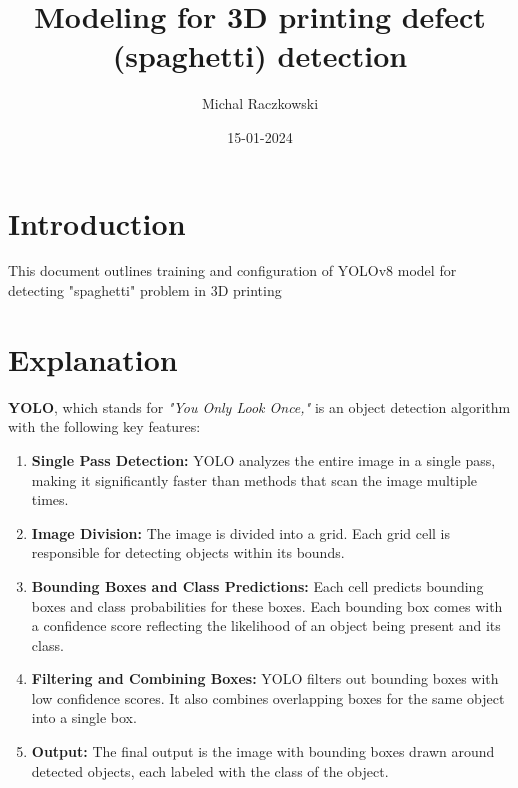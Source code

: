 \documentclass[12pt,a4paper]{article}
\title{\textbf{Modeling for 3D printing defect (spaghetti) detection }}
\author{Michal Raczkowski}
\date{15-01-2024}
\begin{document}
\maketitle
\thispagestyle{empty} %

\newpage
\tableofcontents
\newpage

\setcounter{page}{1} %

\section{Introduction}
This document outlines training and configuration of YOLOv8{ \scriptsize \cite{yolo}} model for detecting "spaghetti" problem in 3D printing 

\section{Explanation}

\textbf{YOLO}, which stands for \textit{"You Only Look Once,"} is an object detection algorithm with the following key features:

\begin{enumerate}
    \item \textbf{Single Pass Detection:} YOLO analyzes the entire image in a single pass, making it significantly faster than methods that scan the image multiple times.

    \item \textbf{Image Division:} The image is divided into a grid. Each grid cell is responsible for detecting objects within its bounds.

    \item \textbf{Bounding Boxes and Class Predictions:} Each cell predicts bounding boxes and class probabilities for these boxes. Each bounding box comes with a confidence score reflecting the likelihood of an object being present and its class.

    \item \textbf{Filtering and Combining Boxes:} YOLO filters out bounding boxes with low confidence scores. It also combines overlapping boxes for the same object into a single box.

    \item \textbf{Output:} The final output is the image with bounding boxes drawn around detected objects, each labeled with the class of the object.
\end{enumerate}
\end{document}
